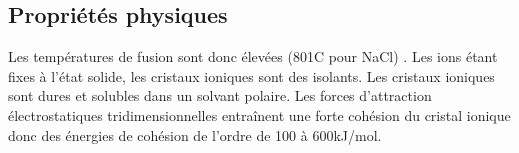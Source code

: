 \subsection{Propriétés physiques}
Les températures de fusion sont donc élevées (801\degre C pour NaCl)
 .
Les ions étant fixes à l'état solide, les cristaux ioniques sont des isolants. Les cristaux ioniques sont
dures et solubles dans un solvant polaire. Les forces d’attraction électrostatiques
tridimensionnelles entraînent une forte cohésion du cristal ionique donc des 
énergies de cohésion de l’ordre de 100 à 600kJ/mol.















